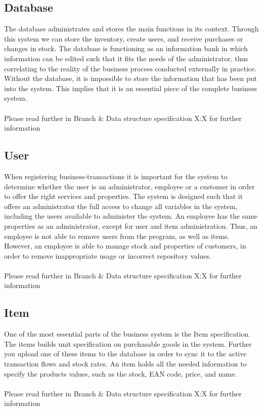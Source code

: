 \documentclass[11pt]{article}
\begin{document}
\subsection{Database}
The database administrates and stores the main functions in its context. Through this system we can store the inventory, create users, and receive purchases or changes in stock.
The database is functioning as an information bank in which information can be edited such that it fits the needs of the administrator, thus correlating to the reality of the business process conducted externally in practice. Without the database, it is impossible to store the information that has been put into the system. This implies that it is an essential piece of the complete business system.\\\\
Please read further in Branch \& Data structure specification X:X for further information
\pagebreak
\subsection{User}
When registering business-transactions it is important for the system to determine whether the user is an administrator, employee or a customer in order to offer the right services and properties.
The system is designed such that it offers an administrator the full access to change all variables in the system, including the users available to administer the system.
An employee has the same properties as an administrator, except for user and item administration. Thus, an employee is not able to remove users from the program, as well as items. However, an employee is able to manage stock and properties of customers, in order to remove inappropriate usage or incorrect repository values.\\\\
Please read further in Branch \& Data structure specification X:X for further information
\subsection{Item}
One of the most essential parts of the business system is the Item specification. The items builds unit specification on purchasable goods in the system. Further you upload one of these items to the database in order to sync it to the active transaction flows and stock rates. An item holds all the needed information to specify the products values, such as the stock, EAN code, price, and name. \\\\
Please read further in Branch \& Data structure specification X:X for further information
\end{document}
